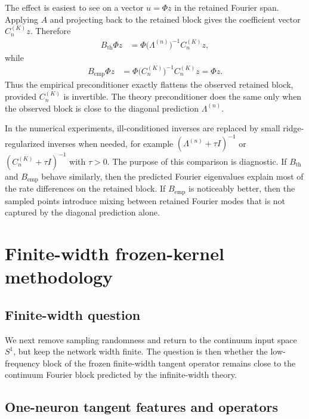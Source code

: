 The effect is easiest to see on a vector \(u=\Phi z\) in the retained Fourier
span. Applying \(A\) and projecting back to the retained block gives the
coefficient vector \(C_n^{(K)}z\). Therefore
\begin{align}
	B_{\mathrm{th}}\Phi z
	 & =
	\Phi
	\bigl(\Lambda^{(n)}\bigr)^{-1}
	C_n^{(K)}z,
	\label{eq:method-theory-preconditioned-block-action}
\end{align}
while
\begin{align}
	B_{\mathrm{emp}}\Phi z
	 & =
	\Phi
	\bigl(C_n^{(K)}\bigr)^{-1}
	C_n^{(K)}z
	=
	\Phi z.
	\label{eq:method-empirical-preconditioned-block-action}
\end{align}
Thus the empirical preconditioner exactly flattens the observed retained block,
provided \(C_n^{(K)}\) is invertible. The theory preconditioner does the same
only when the observed block is close to the diagonal prediction
\(\Lambda^{(n)}\).

In the numerical experiments, ill-conditioned inverses are replaced by small
ridge-regularized inverses when needed, for example
\((\Lambda^{(n)}+\tau I)^{-1}\) or \((C_n^{(K)}+\tau I)^{-1}\) with
\(\tau>0\). The purpose of this comparison is diagnostic. If
\(B_{\mathrm{th}}\) and \(B_{\mathrm{emp}}\) behave similarly, then the predicted
Fourier eigenvalues explain most of the rate differences on the retained block.
If \(B_{\mathrm{emp}}\) is noticeably better, then the sampled points introduce
mixing between retained Fourier modes that is not captured by the diagonal
prediction alone.

\section{Finite-width frozen-kernel methodology}

\subsection{Finite-width question}

We next remove sampling randomness and return to the continuum input space \(S^1\), but keep
the network width finite. The question is then whether the low-frequency block of the frozen
finite-width tangent operator remains close to the continuum Fourier block predicted by the
infinite-width theory.

\subsection{One-neuron tangent features and operators}

